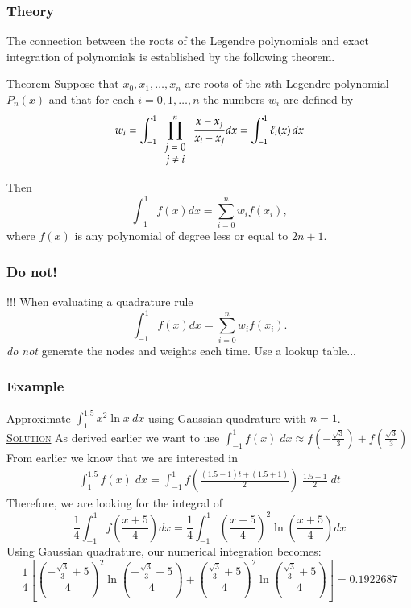 \documentclass[10pt]{beamer}
\begin{document}
\begin{frame}
\frametitle{Theory}
The connection between the roots of the Legendre polynomials and
exact integration of polynomials is established by the following
theorem.

\begin{block}{Theorem} Suppose that $x_0, x_1, \ldots, x_n$ are roots of
the $n$th Legendre polynomial $P_n(x)$ and that for each $i = 0,1,
\ldots, n$ the numbers $w_i$ are defined by
$$w_i = \int_{-1}^1 \prod^n_{\small \begin{array}{c}
  j=0 \\
  j \ne i\\
\end{array}
} \frac{x-x_j}{x_i - x_j}dx = \int_{-1}^{1} \ell_i(x)\,dx
$$

Then 
$$\int_{-1}^1 f(x)dx = \sum_{i=0}^n w_i f(x_i),$$
where $f(x)$ is any polynomial of degree less or equal to $2n+1$.
\end{block}
\end{frame}
\begin{frame}
\frametitle{Do not!}
\begin{alertblock}{!!!}
When evaluating a quadrature rule
\begin{equation*}\int_{-1}^1 f(x)dx = \sum_{i=0}^n w_i f(x_i).\end{equation*}
\emph{do not} generate the nodes and weights each time.  Use a lookup
table...
\end{alertblock}
\end{frame}
\begin{frame}
\frametitle{Example}
Approximate $\displaystyle \int_1^{1.5} x^2\ln x ~dx$ using
Gaussian quadrature with $n=1$. \\
\underline{\textsc{Solution}} As derived earlier we want to use $
\displaystyle \int_{-1}^1 f(x) \; \mathit{dx} \approx
f\left(-\frac{\sqrt{3}}{3}
  \right) + f\left(\frac{\sqrt{3}}{3} \right)$ \\
From earlier we know that we are interested in
\begin{eqnarray*}
  \int_1^{1.5} f(x) \; \mathit{dx} = \int_{-1}^1 f\left(\frac{(1.5-1)t+(1.5+1)}{2}\right) \;
  \frac{1.5-1}{2} \; \mathit{dt}
\end{eqnarray*}
Therefore, we are looking for the integral of
$$\frac{1}{4}\int_{-1}^1 f\left(\frac{x+5}{4}\right)
dx = \frac{1}{4}\int_{-1}^1  \left(\frac{x+5}{4}\right)^2
\ln\left(\frac{x+5}{4}\right)dx
$$
Using Gaussian quadrature, our numerical integration becomes:
$$\frac{1}{4}\left[\left(\frac{-\frac{\sqrt{3}}{3}+5}{4}\right)^2 \ln\left(\frac{-\frac{\sqrt{3}}{3}+5}{4}\right)
+ \left(\frac{\frac{\sqrt{3}}{3}+5}{4}\right)^2
\ln\left(\frac{\frac{\sqrt{3}}{3}+5}{4}\right) \right] =
0.1922687
$$
\end{frame}
\end{document}
